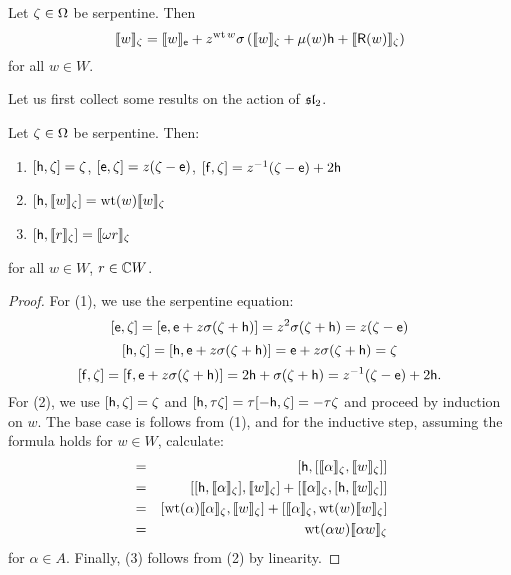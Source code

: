 \begin{prop}\label{prop:bkt-rec}
Let $\zeta\in\Om$ be serpentine. Then
\[
        \bkt{w}_\zeta = \bkt{w}_\e + z^{\wt w} \sigma \left( \bkt{w}_\zeta + \mu(w) \h + \bkt{\R(w)}_\zeta \right)
 \]  
for all $w\in W$.
\end{prop}

Let us first collect some results on the action of $\sl_2$.
\begin{lem} \label{lem:sl2-acts}
        Let $\zeta\in\Om$ be serpentine. Then:
        \begin{enumerate}
                \item $[\h, \zeta] = \zeta$, $[\e, \zeta] = z (\zeta - \e)$, $[\f, \zeta] = z^{-1}(\zeta - \e) + 2\h$
                \item $[\h, \bkt{w}_\zeta] = \wt(w) \bkt{w}_\zeta$
                \item $[\h, \bkt{r}_\zeta] = \bkt{\omega r}_\zeta$
\end{enumerate}
for all $w \in W$, $r \in \CW$.
\end{lem}
\begin{proof} For (1), we use the serpentine equation:
        \[ [\e, \zeta] = [\e, \e + z \sigma (\zeta + \h)] = z^2 \sigma (\zeta + \h) = z (\zeta - \e) \]
        \[ [\h, \zeta] = [\h, \e + z \sigma (\zeta + \h)] = \e + z \sigma (\zeta + \h) = \zeta \]
        \[ [\f, \zeta] = [\f, \e + z \sigma (\zeta + \h)] = 2\h + \sigma (\zeta + \h) = z^{-1} (\zeta - \e) + 2\h. \]
For (2), we use $[\h, \zeta] = \zeta$ and $[\h, \tau\zeta] = \tau[-\h,\zeta]=-\tau\zeta$ and proceed
by induction on $w$. The base case is follows from (1), and for the
inductive step, assuming the formula holds for $w\in W$, calculate:
\begin{eqnarray*}
        [\h, \bkt{\alpha w}_\zeta] &=& [\h, [ \bkt{\alpha}_\zeta, \bkt{w}_\zeta ] ]
                                 \\ &=& [[\h, \bkt{\alpha}_\zeta], \bkt{w}_\zeta ] + [ \bkt{\alpha}_\zeta, [ \h, \bkt{w}_\zeta ] ]
                                 \\ &=& [\wt(\alpha)\bkt{\alpha}_\zeta, \bkt{w}_\zeta] +  [ \bkt{\alpha}_\zeta, \wt(w) \bkt{w}_\zeta ]
                                 \\ &=& \wt(\alpha w)\bkt{\alpha w}_\zeta
\end{eqnarray*}
for $\alpha\in A$. Finally, (3) follows from (2) by linearity. 
\end{proof}

